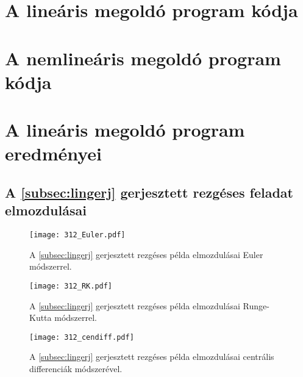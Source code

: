 \appendix


\chapter{A lineáris megoldó program kódja}\label{chap: függ linprog}


 
 
  
  
 
 

\chapter{A nemlineáris megoldó program kódja}\label{chap: függ nemlinprog}


 
 
 
 
 
 

\chapter{A lineáris megoldó program eredményei}\label{chap: függ eredmények}

\section{A \ref{subsec:lingerj} gerjesztett rezgéses  feladat elmozdulásai}\label{sec:függ_lingerj}

\begin{figure}[H]
\centering
\texttt{[image: 312\_Euler.pdf]}
\caption{A \ref{subsec:lingerj} gerjesztett rezgéses példa elmozdulásai Euler módszerrel.}
\label{fig:függlingerjeredm_euler}
\end{figure}
\begin{figure}[H]
\centering
\texttt{[image: 312\_RK.pdf]}
\caption{A \ref{subsec:lingerj} gerjesztett rezgéses példa elmozdulásai Runge-Kutta módszerrel.}
\label{fig:függlingerjeredm_rk}
\end{figure}
\begin{figure}[H]
\centering
\texttt{[image: 312\_cendiff.pdf]}
\caption{A \ref{subsec:lingerj} gerjesztett rezgéses példa elmozdulásai centrális differenciák módszerével.}
\label{fig:függlingerjeredm_centdiff}
\end{figure}

